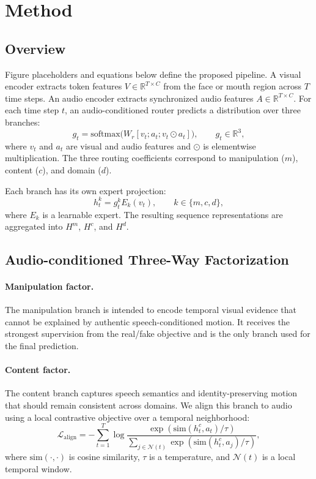 \documentclass{article}
\newcommand{\R}{\mathbb{R}}
\begin{document}
\section{Method}

\subsection{Overview}

Figure placeholders and equations below define the proposed pipeline. A visual encoder extracts token features $V \in \R^{T \times C}$ from the face or mouth region across $T$ time steps. An audio encoder extracts synchronized audio features $A \in \R^{T \times C}$. For each time step $t$, an audio-conditioned router predicts a distribution over three branches:
\begin{equation}
g_t = \mathrm{softmax}\big(W_r [v_t; a_t; v_t \odot a_t]\big), \qquad g_t \in \R^3,
\end{equation}
where $v_t$ and $a_t$ are visual and audio features and $\odot$ is elementwise multiplication. The three routing coefficients correspond to manipulation ($m$), content ($c$), and domain ($d$).

Each branch has its own expert projection:
\begin{equation}
h_t^k = g_t^k E_k(v_t), \qquad k \in \{m,c,d\},
\end{equation}
where $E_k$ is a learnable expert. The resulting sequence representations are aggregated into $H^m$, $H^c$, and $H^d$.

\subsection{Audio-conditioned Three-Way Factorization}

\paragraph{Manipulation factor.}
The manipulation branch is intended to encode temporal visual evidence that cannot be explained by authentic speech-conditioned motion. It receives the strongest supervision from the real/fake objective and is the only branch used for the final prediction.

\paragraph{Content factor.}
The content branch captures speech semantics and identity-preserving motion that should remain consistent across domains. We align this branch to audio using a local contrastive objective over a temporal neighborhood:
\begin{equation}
\mathcal{L}_{\mathrm{align}} = - \sum_{t=1}^T
\log
\frac{\exp(\mathrm{sim}(h_t^c, a_t)/\tau)}
{\sum_{j \in \mathcal{N}(t)} \exp(\mathrm{sim}(h_t^c, a_j)/\tau)},
\end{equation}
where $\mathrm{sim}(\cdot,\cdot)$ is cosine similarity, $\tau$ is a temperature, and $\mathcal{N}(t)$ is a local temporal window.
\end{document}
